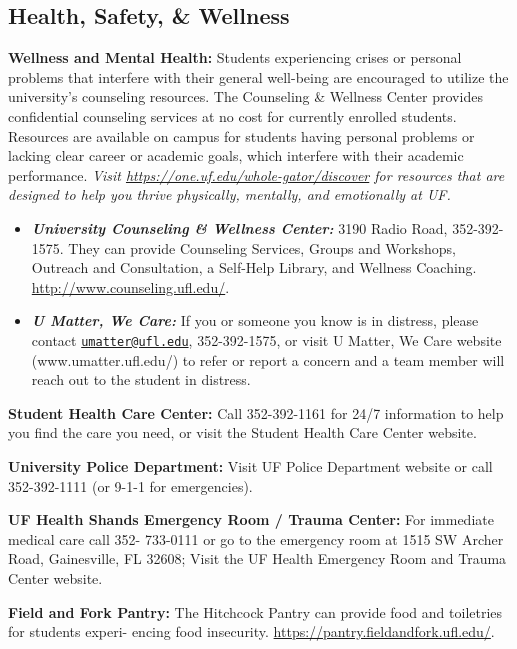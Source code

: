 \documentclass[
  10pt,
  letterpaper,
  oneside,
  open=any]{scrbook}
\begin{document}
\subsection*{Health, Safety, \& Wellness}\label{health-safety-wellness}

\textbf{Wellness and Mental Health: }Students experiencing crises or
personal problems that interfere with their general well-being are
encouraged to utilize the university's counseling resources. The
Counseling \& Wellness Center provides confidential counseling services
at no cost for currently enrolled students. Resources are available on
campus for students having personal problems or lacking clear career or
academic goals, which interfere with their academic performance.
\emph{Visit \url{https://one.uf.edu/whole-gator/discover} for resources
that are designed to help you thrive physically, mentally, and
emotionally at UF.}

\begin{itemize}
\item
  \textbf{\emph{University Counseling \& Wellness Center:}} 3190 Radio
  Road, 352-392-1575. They can provide Counseling Services, Groups and
  Workshops, Outreach and Consultation, a Self-Help Library, and
  Wellness Coaching. \url{http://www.counseling.ufl.edu/}.
\item
  \textbf{\emph{U Matter, We Care:}} If you or someone you know is in
  distress, please contact
  \href{mailto:umatter@ufl.edu}{\nolinkurl{umatter@ufl.edu}},
  352-392-1575, or visit U Matter, We Care website
  (www.umatter.ufl.edu/) to refer or report a concern and a team member
  will reach out to the student in distress.
\end{itemize}

\textbf{Student Health Care Center:} Call 352-392-1161 for 24/7
information to help you find the care you need, or visit the Student
Health Care Center website.

\textbf{University Police Department:} Visit UF Police Department
website or call 352-392-1111 (or 9-1-1 for emergencies).

\textbf{UF Health Shands Emergency Room / Trauma Center:} For immediate
medical care call 352- 733-0111 or go to the emergency room at 1515 SW
Archer Road, Gainesville, FL 32608; Visit the UF Health Emergency Room
and Trauma Center website.

\textbf{Field and Fork Pantry:} The Hitchcock Pantry can provide food
and toiletries for students experi- encing food insecurity.
\url{https://pantry.fieldandfork.ufl.edu/}.
\end{document}
